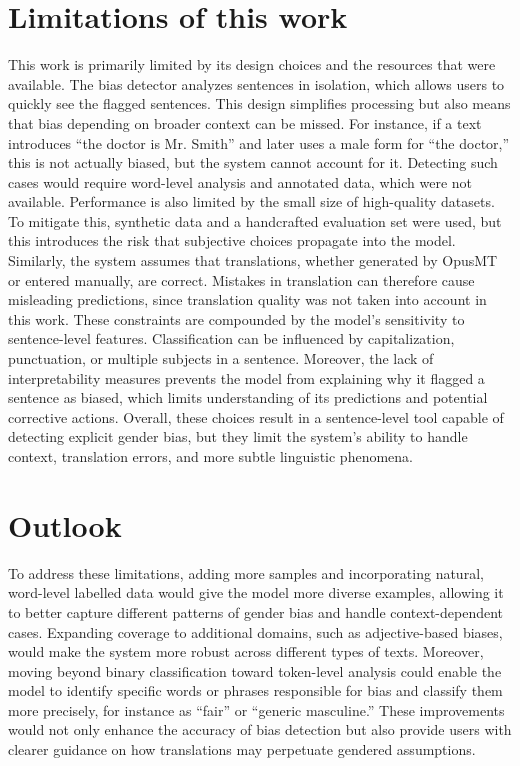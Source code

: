 \section{Limitations of this work}
   This work is primarily limited by its design choices and the resources that were available. The bias detector analyzes sentences in isolation, which allows users to quickly see the flagged sentences. This design simplifies processing but also means that bias depending on broader context can be missed. For instance, if a text introduces “the doctor is Mr. Smith” and later uses a male form for “the doctor,” this is not actually biased, but the system cannot account for it. Detecting such cases would require word-level analysis and annotated data, which were not available. Performance is also limited by the small size of high-quality datasets. To mitigate this, synthetic data and a handcrafted evaluation set were used, but this introduces the risk that subjective choices propagate into the model. Similarly, the system assumes that translations, whether generated by OpusMT or entered manually, are correct. Mistakes in translation can therefore cause misleading predictions, since translation quality was not taken into account in this work. These constraints are compounded by the model's sensitivity to sentence-level features. Classification can be influenced by capitalization, punctuation, or multiple subjects in a sentence. Moreover, the lack of interpretability measures prevents the model from explaining why it flagged a sentence as biased, which limits understanding of its predictions and potential corrective actions. Overall, these choices result in a sentence-level tool capable of detecting explicit gender bias, but they limit the system's ability to handle context, translation errors, and more subtle linguistic phenomena.

\section{Outlook}
   To address these limitations, adding more samples and incorporating natural, word-level labelled data would give the model more diverse examples, allowing it to better capture different patterns of gender bias and handle context-dependent cases. Expanding coverage to additional domains, such as adjective-based biases, would make the system more robust across different types of texts. Moreover, moving beyond binary classification toward token-level analysis could enable the model to identify specific words or phrases responsible for bias and classify them more precisely, for instance as “fair” or “generic masculine.” These improvements would not only enhance the accuracy of bias detection but also provide users with clearer guidance on how translations may perpetuate gendered assumptions.

